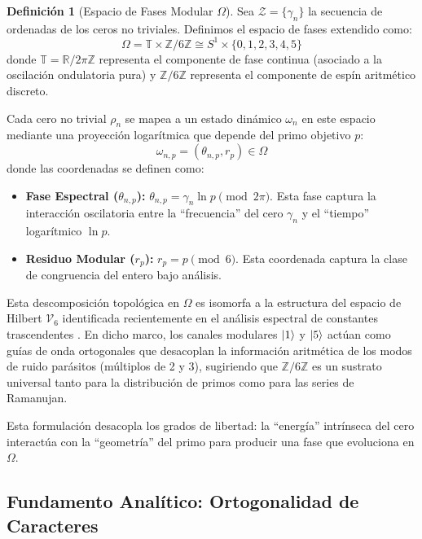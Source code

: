 \documentclass[12pt, a4paper]{article}
\theoremstyle{plain}
\theoremstyle{definition}
\newtheorem{definicion}[teorema]{Definición}
\newcommand{\Z}{\mathbb{Z}}
\newcommand{\R}{\mathbb{R}}
\newcommand{\T}{\mathbb{T}}
\begin{document}
\begin{definicion}[Espacio de Fases Modular $\Omega$]
Sea $\mathcal{Z} = \{\gamma_n\}$ la secuencia de ordenadas de los ceros no triviales. Definimos el espacio de fases extendido como:
\begin{equation}
    \Omega = \T \times \Z/6\Z \cong S^1 \times \{0, 1, 2, 3, 4, 5\}
\end{equation}
donde $\T = \R/2\pi\Z$ representa el componente de fase continua (asociado a la oscilación ondulatoria pura) y $\Z/6\Z$ representa el componente de espín aritmético discreto.
\end{definicion}

Cada cero no trivial $\rho_n$ se mapea a un estado dinámico $\omega_n$ en este espacio mediante una proyección logarítmica que depende del primo objetivo $p$:
\begin{equation}
    \omega_{n,p} = (\theta_{n,p}, r_p) \in \Omega
\end{equation}
donde las coordenadas se definen como:
\begin{itemize}
    \item \textbf{Fase Espectral ($\theta_{n,p}$):} $\theta_{n,p} = \gamma_n \ln p \pmod{2\pi}$. Esta fase captura la interacción oscilatoria entre la ``frecuencia'' del cero $\gamma_n$ y el ``tiempo'' logarítmico $\ln p$.
    \item \textbf{Residuo Modular ($r_p$):} $r_p = p \pmod{6}$. Esta coordenada captura la clase de congruencia del entero bajo análisis.
\end{itemize}

Esta descomposición topológica en $\Omega$ es isomorfa a la estructura del espacio de Hilbert $\mathcal{V}_6$ identificada recientemente en el análisis espectral de constantes trascendentes \cite{peinador_pi_2025}. En dicho marco, los canales modulares $\ket{1}$ y $\ket{5}$ actúan como guías de onda ortogonales que desacoplan la información aritmética de los modos de ruido parásitos (múltiplos de 2 y 3), sugiriendo que $\Z/6\Z$ es un sustrato universal tanto para la distribución de primos como para las series de Ramanujan.

Esta formulación desacopla los grados de libertad: la ``energía'' intrínseca del cero interactúa con la ``geometría'' del primo para producir una fase que evoluciona en $\Omega$.

\subsection{Fundamento Analítico: Ortogonalidad de Caracteres}
\end{document}
